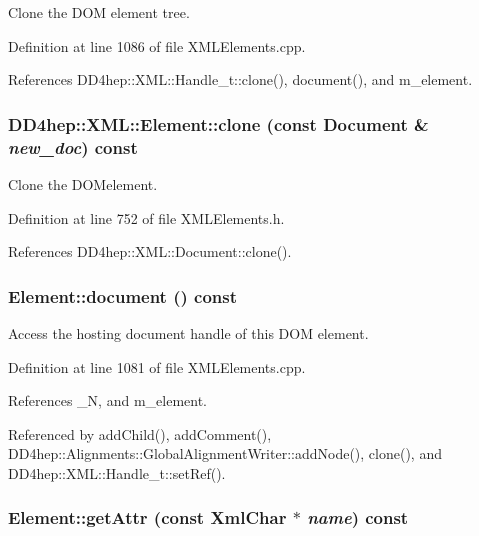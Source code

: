 Clone the DOM element tree. 

Definition at line 1086 of file XMLElements.cpp.

References DD4hep::XML::Handle\_\-t::clone(), document(), and m\_\-element.\hypertarget{class_d_d4hep_1_1_x_m_l_1_1_element_a0f11a4fda55875a9998c4c5ce4c5943e}{
\subsubsection[{clone}]{ DD4hep::XML::Element::clone (const {\bf Document} \& {\em new\_\-doc}) const}}
\label{class_d_d4hep_1_1_x_m_l_1_1_element_a0f11a4fda55875a9998c4c5ce4c5943e}


Clone the DOMelement. 

Definition at line 752 of file XMLElements.h.

References DD4hep::XML::Document::clone().\hypertarget{class_d_d4hep_1_1_x_m_l_1_1_element_a6bbad32abb6077fe0cc8fff54eb5cbaa}{
\subsubsection[{document}]{ Element::document () const}}
\label{class_d_d4hep_1_1_x_m_l_1_1_element_a6bbad32abb6077fe0cc8fff54eb5cbaa}


Access the hosting document handle of this DOM element. 

Definition at line 1081 of file XMLElements.cpp.

References \_\-N, and m\_\-element.

Referenced by addChild(), addComment(), DD4hep::Alignments::GlobalAlignmentWriter::addNode(), clone(), and DD4hep::XML::Handle\_\-t::setRef().\hypertarget{class_d_d4hep_1_1_x_m_l_1_1_element_ab73f0eb0a66e90f3d99e9fdc0534ee61}{
\subsubsection[{getAttr}]{ Element::getAttr (const {\bf XmlChar} $\ast$ {\em name}) const}}
\label{class_d_d4hep_1_1_x_m_l_1_1_element_ab73f0eb0a66e90f3d99e9fdc0534ee61}


